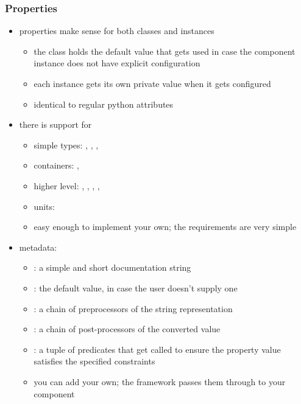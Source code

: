 \begin{frame}[fragile]
%
  \frametitle{Properties}
%
  \begin{itemize}
%
  \item properties make sense for both classes and instances
    \begin{itemize}
    \item the class holds the default value that gets used in case the component instance does
      not have explicit configuration
    \item each instance gets its own private value when it gets configured
    \item identical to regular python attributes
    \end{itemize}
%
  \item there is support for 
    \begin{itemize}
    \item simple types: , , , 
    \item containers: , 
    \item higher level: , , ,
      , 
    \item units: 
    \item easy enough to implement your own; the requirements are very simple
    \end{itemize}
%
  \item metadata:
    \begin{itemize}
    \item {}: a simple and short documentation string
    \item {}: the default value, in case the user doesn't supply one
    \item {}: a chain of preprocessors of the string representation
    \item {}: a chain of post-processors of the converted value
    \item {}: a tuple of predicates that get called to ensure the property
      value satisfies the specified constraints
    \item you can add your own; the framework passes them through to your component
    \end{itemize}
%
  \end{itemize}
%
\end{frame}

